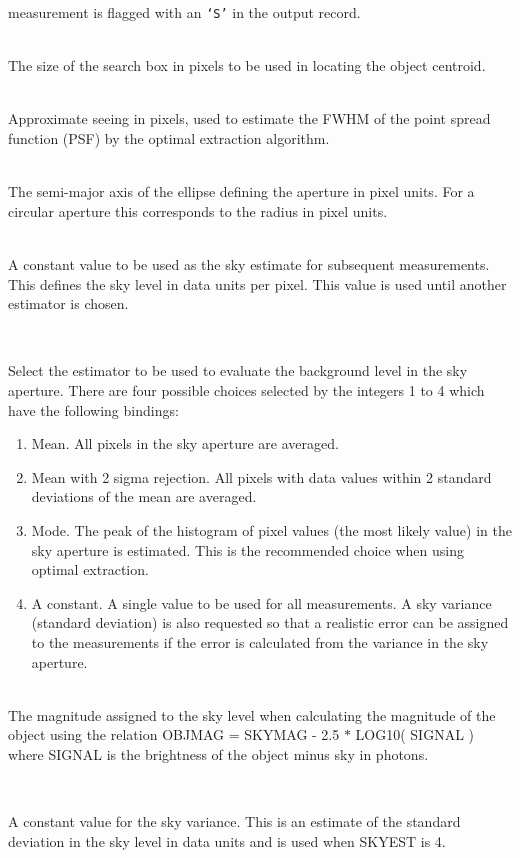 \documentclass[twoside,11pt]{article}
\renewcommand{\_}{\texttt{\symbol{95}}}
\newcommand{\st}[1]{\texttt{`#1'}}
\newcommand{\sstsubsection}[1]{ \item[{#1}] \mbox{} \\}
\newcommand{\sstsubsection}[1]{\item[{#1}]}
\begin{document}
{{{         measurement is flagged with an \st{S} in the output record.
      }
      \sstsubsection{
         SEARCH = \_INTEGER (Read)
      }{
         The size of the search box in pixels to be used in locating the
         object centroid.
      }
      \sstsubsection{
         SEE = \_REAL (Read)
      }{
         Approximate seeing in pixels, used to estimate the FWHM of the
         point spread function (PSF) by the optimal extraction algorithm.
      }
      \sstsubsection{
         SEMIM = \_REAL (Read)
      }{
         The semi-major axis of the ellipse defining the aperture in
         pixel units. For a circular aperture this corresponds to the
         radius in pixel units.
      }
      \sstsubsection{
         SKY = \_REAL (Read)
      }{
         A constant value to be used as the sky estimate for subsequent
         measurements. This defines the sky level in data units per
         pixel. This value is used until another estimator is chosen.
      }
      \sstsubsection{
         SKYEST = \_INTEGER (Read)
      }{
         Select the estimator to be used to evaluate the background
         level in the sky aperture. There are four possible choices
         selected by the integers 1 to 4 which have the following
         bindings:
         \begin{enumerate}
         \item Mean. All pixels in the sky aperture are averaged.
         \item Mean with 2 sigma rejection. All pixels with data values
               within 2 standard deviations of the mean are averaged.
         \item Mode. The peak of the histogram of pixel values (the most
               likely value) in the sky aperture is estimated. This is
               the recommended choice when using optimal extraction.
         \item A constant. A single value to be used for all
            measurements. A sky variance (standard deviation) is
            also requested so that a realistic error can be assigned
            to the measurements if the error is calculated from the
            variance in the sky aperture.
         \end{enumerate}
      }
      \sstsubsection{
         SKYMAG = \_REAL (Read)
      }{
         The magnitude assigned to the sky level when calculating the
         magnitude of the object using the relation
         OBJMAG = SKYMAG - 2.5 $*$ LOG10( SIGNAL )
         where SIGNAL is the brightness of the object minus sky in
         photons.
      }
      \sstsubsection{
         SKYSIG = \_REAL (Read)
      }{
        A constant value for the sky variance. This is an estimate of
        the standard deviation in the sky level in data units and is
        used when SKYEST is 4.

}}}
\end{document}
